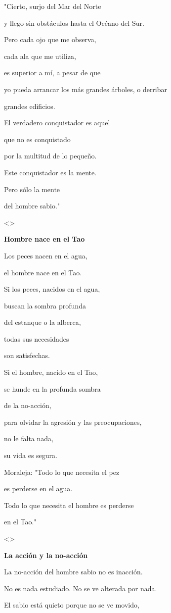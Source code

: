 "Cierto, surjo del Mar del Norte

y llego sin obstáculos hasta el Océano del Sur.

Pero cada ojo que me observa,

cada ala que me utiliza,

es superior a mí, a pesar de que

yo pueda arrancar los más grandes árboles, o derribar

grandes edificios.

El verdadero conquistador es aquel

que no es conquistado

por la multitud de lo pequeño.

Este conquistador es la mente.

Pero sólo la mente

del hombre sabio."

\textless\textgreater{}

\textbf{{Hombre nace en el Tao}}

Los peces nacen en el agua,

el hombre nace en el Tao.

Si los peces, nacidos en el agua,

buscan la sombra profunda

del estanque o la alberca,

todas sus necesidades

son satisfechas.

Si el hombre, nacido en el Tao,

se hunde en la profunda sombra

de la no-acción,

para olvidar la agresión y las preocupaciones,

no le falta nada,

su vida es segura.

Moraleja: "Todo lo que necesita el pez

es perderse en el agua.

Todo lo que necesita el hombre es perderse

en el Tao."

\textless\textgreater{}

\textbf{{La acción y la no-acción}}

La no-acción del hombre sabio no es inacción.

No es nada estudiado. No se ve alterada por nada.

El sabio está quieto porque no se ve movido,

